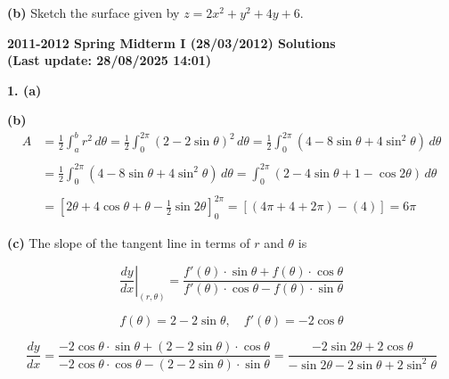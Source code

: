 \documentclass{article}
\begin{document}
\textbf{(b)} Sketch the surface given by $z=2x^2+y^2+4y+6$.

\newpage

\begin{center}
\textbf{2011-2012 Spring Midterm I (28/03/2012) Solutions\\
(Last update: 28/08/2025 14:01)}
\end{center}

\textbf{1. (a)}
\begin{center}
\end{center}

\textbf{(b)}
\begin{align*}A&=\frac12\int_a^br^2\,d\theta=\frac12\int_0^{2\pi}\left(2-2\sin\theta\right)^2\,d\theta=\frac12\int_0^{2\pi}\left(4-8\sin\theta+4\sin^2\theta\right)\,d\theta\\\\&=\frac12\int_0^{2\pi}\left(4-8\sin\theta+4\sin^2\theta\right)\,d\theta=\int_0^{2\pi}\left(2-4\sin\theta+1-\cos2\theta\right)\,d\theta\\\\&=\left[2\theta+4\cos\theta+\theta-\frac12\sin2\theta\right]_0^{2\pi}=\left[\left(4\pi+4+2\pi\right)-(4)\right]=\boxed{6\pi}\end{align*}

\textbf{(c)} The slope of the tangent line in terms of $r$ and $\theta$ is

\[\left.\frac{dy}{dx}\right|_{(r,\theta)}=\frac{f'(\theta)\cdot\sin\theta+f(\theta)\cdot\cos\theta}{f'(\theta)\cdot\cos\theta-f(\theta)\cdot\sin\theta}\]

\[f(\theta)=2-2\sin\theta, \quad f'(\theta)=-2\cos\theta\]

\[\frac{dy}{dx}=\frac{-2\cos\theta\cdot\sin\theta+(2-2\sin\theta)\cdot\cos\theta}{-2\cos\theta\cdot\cos\theta-(2-2\sin\theta)\cdot\sin\theta}=\frac{-2\sin2\theta+2\cos\theta}{-\sin2\theta-2\sin\theta+2\sin^2\theta}\]
\end{document}
